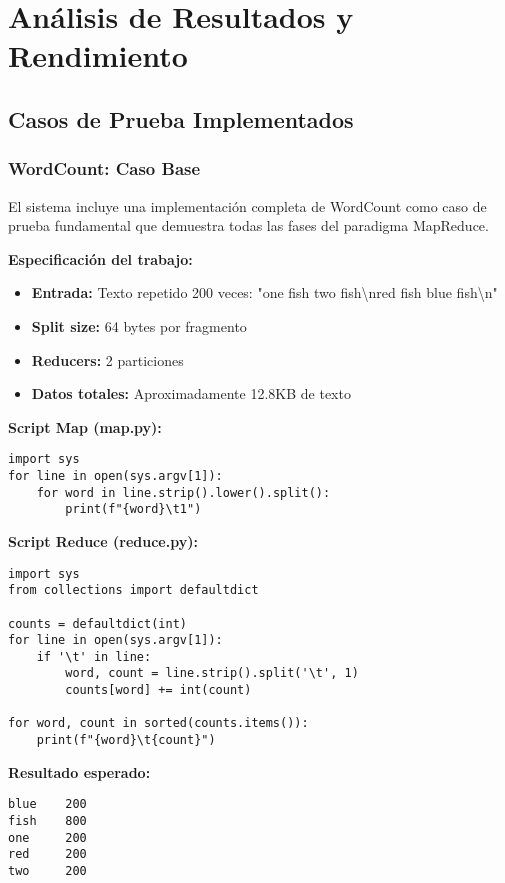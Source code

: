 \section{Análisis de Resultados y Rendimiento}

\subsection{Casos de Prueba Implementados}

\subsubsection{WordCount: Caso Base}

El sistema incluye una implementación completa de WordCount como caso de prueba fundamental que demuestra todas las fases del paradigma MapReduce.

\textbf{Especificación del trabajo:}
\begin{itemize}
    \item \textbf{Entrada:} Texto repetido 200 veces: "one fish two fish\textbackslash nred fish blue fish\textbackslash n"
    \item \textbf{Split size:} 64 bytes por fragmento
    \item \textbf{Reducers:} 2 particiones
    \item \textbf{Datos totales:} Aproximadamente 12.8KB de texto
\end{itemize}

\textbf{Script Map (map.py):}
\begin{verbatim}
import sys
for line in open(sys.argv[1]):
    for word in line.strip().lower().split():
        print(f"{word}\t1")
\end{verbatim}

\textbf{Script Reduce (reduce.py):}
\begin{verbatim}
import sys
from collections import defaultdict

counts = defaultdict(int)
for line in open(sys.argv[1]):
    if '\t' in line:
        word, count = line.strip().split('\t', 1)
        counts[word] += int(count)

for word, count in sorted(counts.items()):
    print(f"{word}\t{count}")
\end{verbatim}

\textbf{Resultado esperado:}
\begin{verbatim}
blue    200
fish    800
one     200
red     200
two     200
\end{verbatim}


